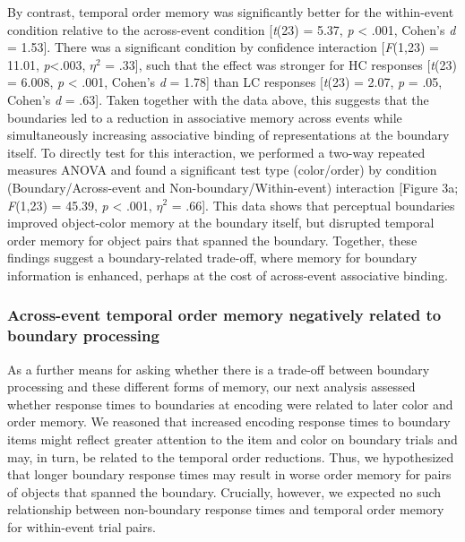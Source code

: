 By contrast, temporal order memory was significantly better for the
within-event condition relative to the across-event condition
{[}\emph{t}(23) = 5.37, \emph{p} \textless{} .001, Cohen's \emph{d} =
1.53{]}. There was a significant condition by confidence interaction
{[}\emph{F}(1,23) = 11.01, \emph{p}\textless{}.003, \(\eta^{2}\) =
.33{]}, such that the effect was stronger for HC responses
{[}\emph{t}(23) = 6.008, \emph{p} \textless{} .001, Cohen's \emph{d} =
1.78{]} than LC responses {[}\emph{t}(23) = 2.07, \emph{p} = .05,
Cohen's \emph{d} = .63{]}. Taken together with the data above, this
suggests that the boundaries led to a reduction in associative memory
across events while simultaneously increasing associative binding of
representations at the boundary itself. To directly test for this
interaction, we performed a two-way repeated measures ANOVA and found a
significant test type (color/order) by condition (Boundary/Across-event
and Non-boundary/Within-event) interaction {[}Figure 3a; \emph{F}(1,23)
= 45.39, \emph{p} \textless{} .001, \(\eta^{2}\) = .66{]}. This data
shows that perceptual boundaries improved object-color memory at the
boundary itself, but disrupted temporal order memory for object pairs
that spanned the boundary. Together, these findings suggest a
boundary-related trade-off, where memory for boundary information is
enhanced, perhaps at the cost of across-event associative binding.

\subsubsection{Across-event temporal order memory negatively related to
boundary
processing}\label{across-event-temporal-order-memory-negatively-related-to-boundary-processing}

As a further means for asking whether there is a trade-off between
boundary processing and these different forms of memory, our next
analysis assessed whether response times to boundaries at encoding were
related to later color and order memory. We reasoned that increased
encoding response times to boundary items might reflect greater
attention to the item and color on boundary trials and may, in turn, be
related to the temporal order reductions. Thus, we hypothesized that
longer boundary response times may result in worse order memory for
pairs of objects that spanned the boundary. Crucially, however, we
expected no such relationship between non-boundary response times and
temporal order memory for within-event trial pairs.

